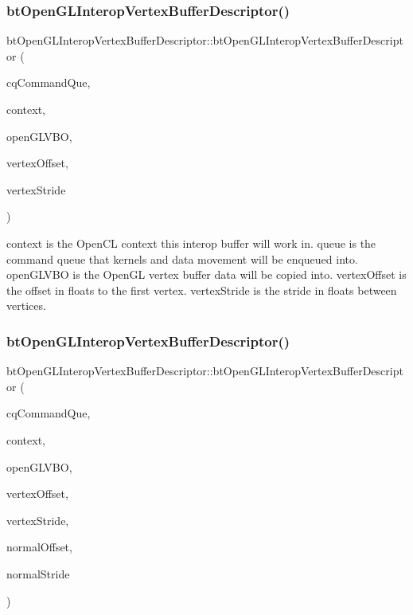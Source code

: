 \subsubsection{\texorpdfstring{bt\+Open\+G\+L\+Interop\+Vertex\+Buffer\+Descriptor()}{btOpenGLInteropVertexBufferDescriptor()}\hspace{0.1cm}{\footnotesize\ttfamily [3/4]}}
{\footnotesize\ttfamily bt\+Open\+G\+L\+Interop\+Vertex\+Buffer\+Descriptor\+::bt\+Open\+G\+L\+Interop\+Vertex\+Buffer\+Descriptor (\begin{DoxyParamCaption}\item[{cl\+\_\+command\+\_\+queue}]{cq\+Command\+Que,  }\item[{cl\+\_\+context}]{context,  }\item[{G\+Luint}]{open\+G\+L\+V\+BO,  }\item[{int}]{vertex\+Offset,  }\item[{int}]{vertex\+Stride }\end{DoxyParamCaption})\hspace{0.3cm}{\ttfamily [inline]}}

context is the Open\+CL context this interop buffer will work in. queue is the command queue that kernels and data movement will be enqueued into. open\+G\+L\+V\+BO is the Open\+GL vertex buffer data will be copied into. vertex\+Offset is the offset in floats to the first vertex. vertex\+Stride is the stride in floats between vertices. \mbox{\label{classbtOpenGLInteropVertexBufferDescriptor_a427f8c5e77e3a8a4334c3a63d97c17ba}} 
\subsubsection{\texorpdfstring{bt\+Open\+G\+L\+Interop\+Vertex\+Buffer\+Descriptor()}{btOpenGLInteropVertexBufferDescriptor()}\hspace{0.1cm}{\footnotesize\ttfamily [4/4]}}
{\footnotesize\ttfamily bt\+Open\+G\+L\+Interop\+Vertex\+Buffer\+Descriptor\+::bt\+Open\+G\+L\+Interop\+Vertex\+Buffer\+Descriptor (\begin{DoxyParamCaption}\item[{cl\+\_\+command\+\_\+queue}]{cq\+Command\+Que,  }\item[{cl\+\_\+context}]{context,  }\item[{G\+Luint}]{open\+G\+L\+V\+BO,  }\item[{int}]{vertex\+Offset,  }\item[{int}]{vertex\+Stride,  }\item[{int}]{normal\+Offset,  }\item[{int}]{normal\+Stride }\end{DoxyParamCaption})\hspace{0.3cm}{\ttfamily [inline]}}

